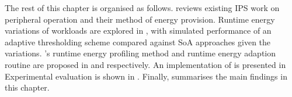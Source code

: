 The rest of this chapter is organised as follows.
 reviews existing IPS work on peripheral operation and their method of energy provision.
Runtime energy variations of workloads are explored in , with simulated performance of an adaptive thresholding scheme compared against SoA approaches given the variations. 
\nn{}'s runtime energy profiling method and runtime energy adaption routine are proposed in  and  respectively. 
An implementation of \nn{} is presented in 
Experimental evaluation is shown in .
Finally,  summarises the main findings in this chapter. 

